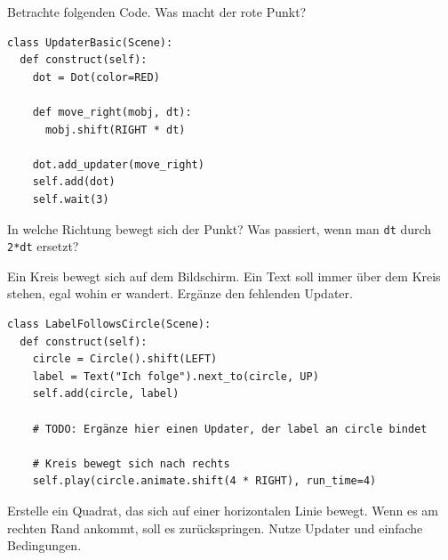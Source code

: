\documentclass[a4paper, 12pt]{mksheetphhd}
\begin{document}
\begin{aufgabe}
	Betrachte folgenden Code. Was macht der rote Punkt?
	
	\begin{verbatim}
class UpdaterBasic(Scene):
  def construct(self):
    dot = Dot(color=RED)

    def move_right(mobj, dt):
      mobj.shift(RIGHT * dt)

    dot.add_updater(move_right)
    self.add(dot)
    self.wait(3)

	\end{verbatim}
	In welche Richtung bewegt sich der Punkt?
	Was passiert, wenn man \verb|dt| durch \verb|2*dt| ersetzt?
\end{aufgabe}

\begin{aufgabe}
	
	Ein Kreis bewegt sich auf dem Bildschirm. Ein Text soll immer über dem Kreis stehen, egal wohin er wandert. Ergänze den fehlenden Updater.
	
	\begin{verbatim}
class LabelFollowsCircle(Scene):
  def construct(self):
    circle = Circle().shift(LEFT)
    label = Text("Ich folge").next_to(circle, UP)
    self.add(circle, label)
    
    # TODO: Ergänze hier einen Updater, der label an circle bindet

    # Kreis bewegt sich nach rechts
    self.play(circle.animate.shift(4 * RIGHT), run_time=4)
	\end{verbatim}
\end{aufgabe}
\begin{aufgabe}
	Erstelle ein Quadrat, das sich auf einer horizontalen Linie bewegt. Wenn es am rechten Rand ankommt, soll es zurückspringen. Nutze Updater und einfache Bedingungen.
\end{aufgabe}
	
	\printlicense
	
\end{document}
